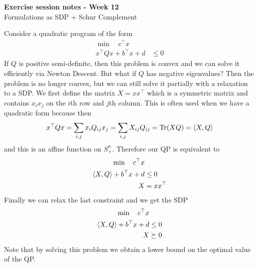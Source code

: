 \documentclass[answers]{exam}
\begin{document}
	$ $
	\begin{center}
		\huge \textbf{Exercise session notes - Week 12}  \\ \vspace*{3mm}
        \Large{Formulations as SDP + Schur Complement}
	\end{center}
	$ $\\

    Consider a quadratic program of the form
    \begin{align*}
        \min\quad c^\top x &\\
        x^\top Qx + b^\top x + d &\leq 0 
    \end{align*}
    If $Q$ is positive semi-definite, then this problem is convex and we can solve it efficiently via Newton Descent. But what if $Q$ has negative eigenvalues? Then the problem is no longer convex, but we can still solve it partially with a relaxation to a SDP. We first define the matrix $X = xx^\top$ which is a symmetric matrix and contains $x_ix_j$ on the $i$th row and $j$th column. This is often used when we have a quadratic form because then 
    $$ x^\top Q x = \sum_{i,j} x_i Q_{ij} x_j = \sum_{i,j} X_{ij} Q_{ij} = \operatorname*{Tr}(XQ) = \left\langle X, Q \right\rangle $$
    and this is an affine function on $S_+^n$. Therefore our QP is equivalent to 
    \begin{align*}
        \min \quad c^\top x& \\ 
        \left\langle X,Q \right\rangle + b^\top x + d &\leq 0 \\ 
        X &= xx^\top
    \end{align*}
    Finally we can relax the last constraint and we get the SDP
    \begin{align*}
        \min \quad c^\top x& \\ 
        \left\langle X,Q \right\rangle + b^\top x + d &\leq 0 \\ 
        X&\succeq 0
    \end{align*}
    Note that by solving this problem we obtain a lower bound on the optimal value of the QP. \\ 
\end{document}
